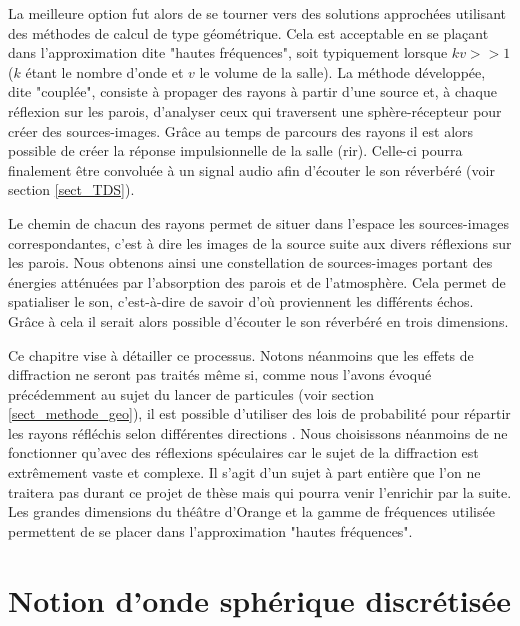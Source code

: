 La meilleure option fut alors de se tourner vers des solutions approchées utilisant des méthodes de calcul de type géométrique. Cela est acceptable en se plaçant dans l'approximation dite "hautes fréquences", soit typiquement lorsque $kv >> 1$ ($k$ étant le nombre d'onde et $v$ le volume de la salle). La méthode développée, dite "couplée", consiste à propager des rayons à partir d'une source et, à chaque réflexion sur les parois, d'analyser ceux qui traversent une sphère-récepteur pour créer des sources-images. Grâce au temps de parcours des rayons il est alors possible de créer la réponse impulsionnelle de la salle (\gls{rir}). Celle-ci pourra finalement être convoluée à un signal audio afin d'écouter le son réverbéré (voir section \ref{sect_TDS}).

Le chemin de chacun des rayons permet de situer dans l'espace les sources-images correspondantes, c'est à dire les images de la source suite aux divers réflexions sur les parois. Nous obtenons ainsi une constellation de sources-images portant des énergies atténuées par l'absorption des parois et de l'atmosphère. Cela permet de spatialiser le son, c'est-à-dire de savoir d'où proviennent les différents échos. Grâce à cela il serait alors possible d'écouter le son réverbéré en trois dimensions. %

Ce chapitre vise à détailler ce processus. Notons néanmoins que les effets de diffraction ne seront pas traités même si, comme nous l'avons évoqué précédemment au sujet du lancer de particules (voir section \ref{sect_methode_geo}), il est possible d'utiliser des lois de probabilité pour répartir les rayons réfléchis selon différentes directions \cite[p.187-199]{diffusion}. Nous choisissons néanmoins de ne fonctionner qu'avec des réflexions spéculaires car le sujet de la diffraction est extrêmement vaste et complexe. Il s'agit d'un sujet à part entière que l'on ne traitera pas durant ce projet de thèse mais qui pourra venir l'enrichir par la suite. Les grandes dimensions du théâtre d'Orange et la gamme de fréquences utilisée permettent de se placer dans l'approximation "hautes fréquences".

\section{Notion d'onde sphérique discrétisée} \label{sect_discretise}

